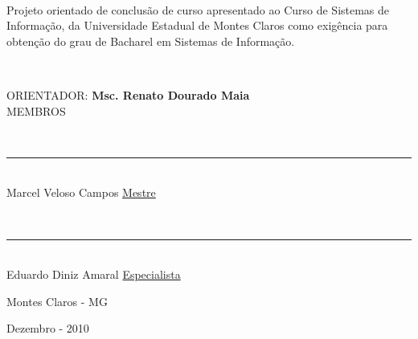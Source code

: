 \documentclass[a4paper,12pt]{report}
\begin{document}
	\ \\[1cm]

\begin{flushright}
	\begin{small}
		\parbox{200pt}{Projeto orientado de conclusão de curso apresentado ao Curso de Sistemas de Informação,	da Universidade Estadual de Montes Claros como exigência para obtenção do grau de Bacharel	em Sistemas de Informação.}
		
	\end{small}
\end{flushright}

\ \\[2cm]

\begin{center}


	ORIENTADOR: \textbf{Msc. Renato Dourado Maia}
	\ \\[2cm]
	MEMBROS

	\ \\[1cm]
	\hrule
	\ \\[0.3cm]
	Marcel Veloso Campos \underline{Mestre}

	\ \\[1cm]
	\hrule
	\ \\[0.3cm]
	Eduardo Diniz Amaral \underline{Especialista}

\end{center}

\begin{center}	
	\vfill
	Montes Claros - MG
	
	Dezembro - 2010 
\end{center}


\def\us{\char`\_}

\thispagestyle{fancy}
\tableofcontents
\thispagestyle{fancy}
\listoffigures
{}
\thispagestyle{fancy}
\listoflistings
{}
\thispagestyle{fancy}

\doublespacing






\clearpage
{}


\end{document}
